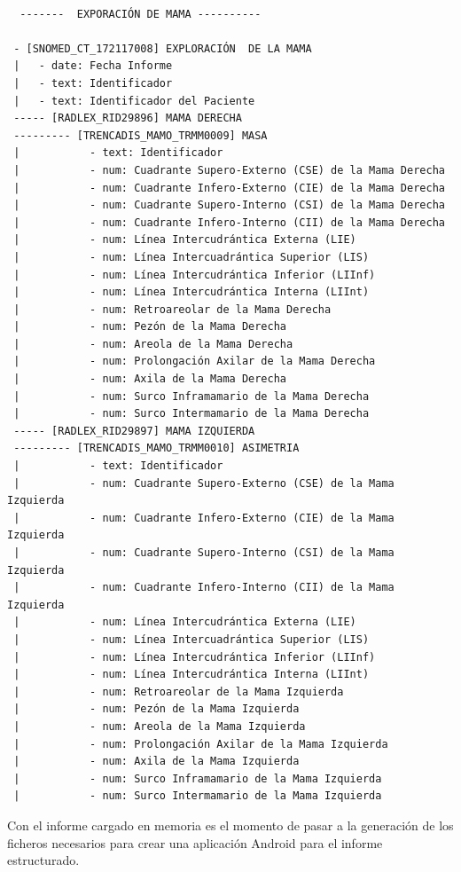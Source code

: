 \begin{lstlisting}[label=ver:dicomTree,caption=Registro del informe DICOM-SR cargado en  memoria]

  -------  EXPORACIÓN DE MAMA ---------- 

 - [SNOMED_CT_172117008] EXPLORACIÓN  DE LA MAMA 
 |   - date: Fecha Informe
 |   - text: Identificador
 |   - text: Identificador del Paciente
 ----- [RADLEX_RID29896] MAMA DERECHA 
 --------- [TRENCADIS_MAMO_TRMM0009] MASA 
 |           - text: Identificador 
 |           - num: Cuadrante Supero-Externo (CSE) de la Mama Derecha 
 |           - num: Cuadrante Infero-Externo (CIE) de la Mama Derecha 
 |           - num: Cuadrante Supero-Interno (CSI) de la Mama Derecha 
 |           - num: Cuadrante Infero-Interno (CII) de la Mama Derecha 
 |           - num: Línea Intercudrántica Externa (LIE)
 |           - num: Línea Intercuadrántica Superior (LIS)
 |           - num: Línea Intercudrántica Inferior (LIInf)
 |           - num: Línea Intercudrántica Interna (LIInt) 
 |           - num: Retroareolar de la Mama Derecha
 |           - num: Pezón de la Mama Derecha
 |           - num: Areola de la Mama Derecha
 |           - num: Prolongación Axilar de la Mama Derecha
 |           - num: Axila de la Mama Derecha 
 |           - num: Surco Inframamario de la Mama Derecha
 |           - num: Surco Intermamario de la Mama Derecha
 ----- [RADLEX_RID29897] MAMA IZQUIERDA 
 --------- [TRENCADIS_MAMO_TRMM0010] ASIMETRIA 
 |           - text: Identificador
 |           - num: Cuadrante Supero-Externo (CSE) de la Mama Izquierda
 |           - num: Cuadrante Infero-Externo (CIE) de la Mama Izquierda
 |           - num: Cuadrante Supero-Interno (CSI) de la Mama Izquierda
 |           - num: Cuadrante Infero-Interno (CII) de la Mama Izquierda
 |           - num: Línea Intercudrántica Externa (LIE) 
 |           - num: Línea Intercuadrántica Superior (LIS) 
 |           - num: Línea Intercudrántica Inferior (LIInf)
 |           - num: Línea Intercudrántica Interna (LIInt) 
 |           - num: Retroareolar de la Mama Izquierda 
 |           - num: Pezón de la Mama Izquierda 
 |           - num: Areola de la Mama Izquierda
 |           - num: Prolongación Axilar de la Mama Izquierda
 |           - num: Axila de la Mama Izquierda
 |           - num: Surco Inframamario de la Mama Izquierda 
 |           - num: Surco Intermamario de la Mama Izquierda 
\end{lstlisting}

Con el informe cargado en memoria es el momento de pasar a la generación de los ficheros necesarios para crear una aplicación Android para el informe estructurado.\par



